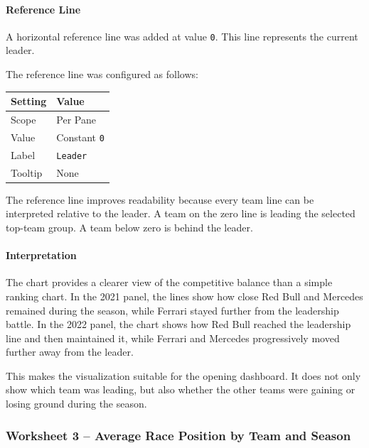 \documentclass[12pt,a4paper]{article}
\begin{document}
	\paragraph{Reference Line}
	
	A horizontal reference line was added at value \texttt{0}.
	This line represents the current leader.
	
	The reference line was configured as follows:
	
	\begin{longtable}{p{5cm} p{8cm}}
		\toprule
		\textbf{Setting} & \textbf{Value} \\
		\midrule
		Scope & Per Pane \\
		Value & Constant \texttt{0} \\
		Label & \texttt{Leader} \\
		Tooltip & None \\
		\bottomrule
	\end{longtable}
	
	The reference line improves readability because every team line can be interpreted relative to the leader.
	A team on the zero line is leading the selected top-team group.
	A team below zero is behind the leader.
	
	\paragraph{Interpretation}
	
	The chart provides a clearer view of the competitive balance than a simple ranking chart.
	In the 2021 panel, the lines show how close Red Bull and Mercedes remained during the season, while Ferrari stayed further from the leadership battle.
	In the 2022 panel, the chart shows how Red Bull reached the leadership line and then maintained it, while Ferrari and Mercedes progressively moved further away from the leader.
	
	This makes the visualization suitable for the opening dashboard.
	It does not only show which team was leading, but also whether the other teams were gaining or losing ground during the season.
	

	\subsubsection{Worksheet 3 -- Average Race Position by Team and Season}
	
\end{document}
